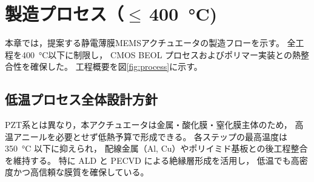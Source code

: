 \section{製造プロセス（\texorpdfstring{$\leq$}{≤}\,\SI{400}{\celsius})}

本章では，提案する静電薄膜MEMSアクチュエータの製造フローを示す。
全工程を\SI{400}{\celsius}以下に制限し，
CMOS BEOL プロセスおよびポリマー実装との熱整合性を確保した。
工程概要を図\ref{fig:process}に示す。

\subsection{低温プロセス全体設計方針}
PZT系とは異なり，本アクチュエータは金属・酸化膜・窒化膜主体のため，
高温アニールを必要とせず低熱予算で形成できる。
各ステップの最高温度は \SI{350}{\celsius} 以下に抑えられ，
配線金属（Al, Cu）やポリイミド基板との後工程整合を維持する。
特に ALD と PECVD による絶縁層形成を活用し，
低温でも高密度かつ高信頼な膜質を確保している。

